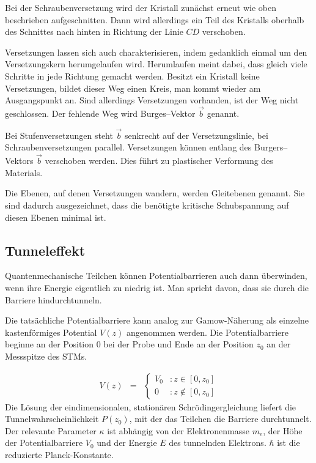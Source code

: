 \documentclass[12pt,a4paper]{scrartcl}
\numberwithin{equation}{section} %
\begin{document}
Bei der Schraubenversetzung wird der Kristall zunächst erneut wie oben beschrieben aufgeschnitten. Dann wird allerdings ein Teil des Kristalls oberhalb des Schnittes nach hinten in Richtung der Linie $CD$ verschoben.

Versetzungen lassen sich auch charakterisieren, indem gedanklich einmal um den Versetzungskern herumgelaufen wird. Herumlaufen meint dabei, dass gleich viele Schritte in jede Richtung gemacht werden. Besitzt ein Kristall keine Versetzungen, bildet dieser Weg einen Kreis, man kommt wieder am Ausgangspunkt an. Sind allerdings Versetzungen vorhanden, ist der Weg nicht geschlossen. Der fehlende Weg wird Burges--Vektor $\vec{b}$ genannt.

Bei Stufenversetzungen steht $\vec{b}$ senkrecht auf der Versetzungslinie, bei Schraubenversetzungen parallel. \cite{Gross} %
Versetzungen können entlang des Burgers--Vektors $\vec{b}$ verschoben werden. Dies führt zu plastischer Verformung des Materials.

Die Ebenen, auf denen Versetzungen wandern, werden Gleitebenen genannt. Sie sind dadurch ausgezeichnet, dass die benötigte kritische Schubspannung auf diesen Ebenen minimal ist.

\hypertarget{tunneleffekt}{%
\subsection{Tunneleffekt}\label{tunneleffekt}}
Quantenmechanische Teilchen können Potentialbarrieren auch dann
überwinden, wenn ihre Energie eigentlich zu niedrig ist. Man spricht
davon, dass sie durch die Barriere hindurchtunneln.

Die tatsächliche Potentialbarriere kann analog zur Gamow-Näherung als
einzelne kastenförmiges Potential $V(z)$ angenommen werden. Die
Potentialbarriere beginne an der Position $0$ bei der Probe und Ende
an der Position $z_0$ an der Messspitze des STMs.

\begin{eqnarray}
    V(z) &=&
        \begin{cases}
            V_0 &: z \in [0, z_0] \\
            0 &: z \notin [0, z_0]
        \end{cases}
\end{eqnarray}
Die Lösung der eindimensionalen, stationären Schrödingergleichung
liefert die Tunnelwahrscheinlichkeit $P(z_0)$, mit der das Teilchen
die Barriere durchtunnelt. Der relevante Parameter $\kappa$ ist
abhängig von der Elektronenmasse $m_e$, der Höhe der Potentialbarriere
$V_0$ und der Energie $E$ des tunnelnden Elektrons. $\hbar$ ist
die reduzierte Planck-Konstante.
\end{document}
